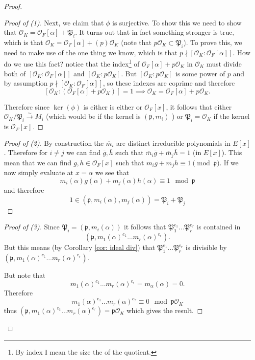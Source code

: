 \documentclass[11pt,a4paper]{report}
\theoremstyle{plain}
\theoremstyle{definition}
\theoremstyle{definition}
\def \gothP{\mathfrak{P}}
\def\gothp{\mathfrak{p}}
\def \a{\alpha}
\def \OO {\mathcal{O}}
\def \ov{\overline}
\def \lra{\longrightarrow}
\begin{document}
\begin{proof}
\begin{proof}[Proof of (1)]
			Next, we claim that $\phi$ is surjective. To show this we need to show that $\OO_K=\OO_F[\a]+\gothP_i$. It turns out that in fact something stronger is true, which is that $\OO_K=\OO_F[\a]+(p)\OO_K$ (note that $p\OO_K \subset \gothP_i$). To prove this, we need to make use of the one thing we know, which is that $p \nmid [\OO_K:\OO_F[\a]]$. How do we use this fact?  notice that the index\footnote{By index I mean the size the of the quotient.} of $\OO_F[\a]+p\OO_K$ in $\OO_K$ must divide both of $[\OO_K:\OO_F[\a]]$ and $[\OO_K:p\OO_K]$. But $[\OO_K:p\OO_K]$ is some power of $p$ and by assumption $p \nmid [\OO_K:\OO_F[\a]]$, so these indexes are coprime and therefore \[[\OO_K: (\OO_F[\a]+p\OO_K)]=1 \implies \OO_K=\OO_F[\a]+p\OO_K.\]
			
			Therefore since $\ker(\phi)$ is either is either  or $\OO_F[x]$, it follows that either  $\OO_K/\gothP_i \overset{\sim}{\lra} M_i$ (which would be if the kernel is $(\gothp,m_i)$ ) or $\gothP_i=\OO_K$ if the kernel is $\OO_F[x]$.
			
			
		\end{proof}
		
		
		\begin{proof}[Proof of (2)]
			By construction the $\ov{m}_i$ are distinct irreducible polynomials in $E[x]$. Therefore for $i \neq j$ we can find $\ov{g},\ov{h}$ such that $\ov{m}_i\ov{g}+\ov{m}_j\ov{h}=1$ (in $E[x]$). This mean that we can find $g,h \in \OO_F[x]$ such that $m_ig+m_jh \equiv 1 \pmod \gothp$. If we now simply evaluate at $x=\a$ we see that \[m_i(\a)g(\a)+m_j(\a)h(\a) \equiv 1 \mod \gothp\] and therefore \[1 \in (\gothp,m_i(\a),m_j(\a))=\gothP_i+\gothP_j\]
			
		\end{proof}
		
		\begin{proof}[Proof of (3)]
			Since $\gothP_i=(\gothp,m_i(\a))$ it follows that $\gothP_1^{e_1}\dots\gothP_r^{e_r}$ is contained in \[(\gothp,m_1(\a)^{e_1}\dots m_r(\a)^{e_r}).\] But this means (by Corollary \ref{cor: ideal div}) that $\gothP_1^{e_1}\dots\gothP_r^{e_r}$ is divisible by $(\gothp,m_1(\a)^{e_1}\dots m_r(\a)^{e_r})$.
			
			But note that \[\ov{m}_1(\a)^{e_1}\dots \ov{m}_r(\a)^{e_r}=\ov{m}_\a(\a)=0.\] Therefore \[m_1(\a)^{e_1}\dots m_r(\a)^{e_r} \equiv 0 \mod \gothp\OO_K\] thus $(\gothp,m_1(\a)^{e_1}\dots m_r(\a)^{e_r})=\gothp\OO_K$ which gives the result.
			
		\end{proof}
		
		
	\end{proof}
	
\end{document}
